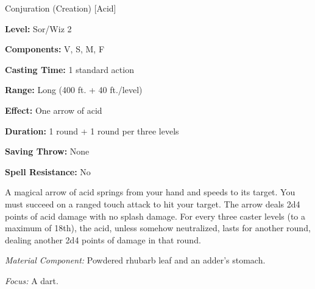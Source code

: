 
Conjuration (Creation) [Acid]

\textbf{Level:} Sor/Wiz 2

\textbf{Components:} V, S, M, F

\textbf{Casting Time:} 1 standard action

\textbf{Range:} Long (400 ft. + 40 ft./level)

\textbf{Effect:} One arrow of acid

\textbf{Duration:} 1 round + 1 round per three levels

\textbf{Saving Throw:} None

\textbf{Spell Resistance:} No

A magical arrow of acid springs from your hand and speeds to its target. You must 
succeed on a ranged touch attack to hit your target. The arrow deals 2d4 points 
of acid damage with no splash damage. For every three caster levels (to a maximum 
of 18th), the acid, unless somehow neutralized, lasts for another round, dealing 
another 2d4 points of damage in that round.

\textit{Material Component:} Powdered rhubarb leaf and an adder's stomach.

\textit{Focus:} A dart.

